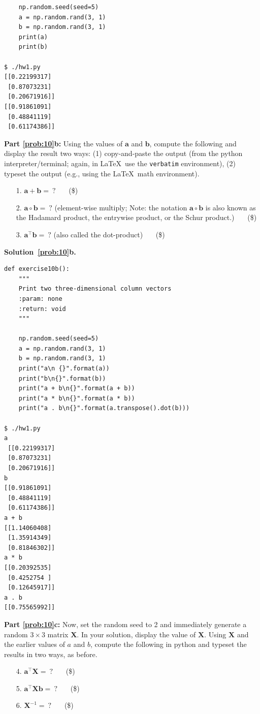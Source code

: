\documentclass[10pt]{article}
\begin{document}
\begin{enumerate}
\begin{verbatim}
    np.random.seed(seed=5)
    a = np.random.rand(3, 1)
    b = np.random.rand(3, 1)
    print(a)
    print(b)
    
$ ./hw1.py
[[0.22199317]
 [0.87073231]
 [0.20671916]]
[[0.91861091]
 [0.48841119]
 [0.61174386]]
\end{verbatim}

{\bf Part \ref{prob:10}b:} Using the values of $\mathbf{a}$ and $\mathbf{b}$, compute the following and display the result two ways: (1) copy-and-paste the output (from the python interpreter/terminal; again, in \LaTeX~use the {\tt verbatim} environment), (2) typeset the output (e.g., using the \LaTeX~math environment).
\begin{enumerate}
\item[1.] $\mathbf{a} + \mathbf{b} = ~?$ ~~~(\$)
\item[2.] $\mathbf{a} \circ \mathbf{b} = ~?$  (element-wise multiply; Note: the notation $\mathbf{a} \circ \mathbf{b}$ is also known as the Hadamard product, the entrywise product, or the Schur product.) ~~~(\$)
\item[3.] $\mathbf{a}^\top \mathbf{b} = ~?$  (also called the dot-product) ~~~(\$)
\end{enumerate}

{\bf Solution~\ref{prob:10}b.} 

\begin{verbatim}
def exercise10b():
    """
    Print two three-dimensional column vectors
    :param: none
    :return: void
    """

    np.random.seed(seed=5)
    a = np.random.rand(3, 1)
    b = np.random.rand(3, 1)
    print("a\n {}".format(a))
    print("b\n{}".format(b))
    print("a + b\n{}".format(a + b))
    print("a * b\n{}".format(a * b))
    print("a . b\n{}".format(a.transpose().dot(b)))

$ ./hw1.py
a
 [[0.22199317]
 [0.87073231]
 [0.20671916]]
b
[[0.91861091]
 [0.48841119]
 [0.61174386]]
a + b
[[1.14060408]
 [1.35914349]
 [0.81846302]]
a * b
[[0.20392535]
 [0.4252754 ]
 [0.12645917]]
a . b
[[0.75565992]]
\end{verbatim}



{\bf Part \ref{prob:10}c:} Now, set the random seed to 2 and immediately generate a random $3 \times 3$ matrix $\mathbf{X}$.  In your solution, display the value of $\mathbf{X}$.  Using $\mathbf{X}$ and the earlier values of $a$ and $b$, compute the following in python and typeset the results in two ways, as before.
\begin{enumerate}
\item[4.] $\mathbf{a}^\top\mathbf{X} = ~?$ ~~~(\$)
\item[5.] $\mathbf{a}^\top\mathbf{X}\mathbf{b} = ~?$ ~~~(\$)
\item[6.] $\mathbf{X}^{-1} = ~?$ ~~~(\$)
\end{enumerate}


\end{enumerate}
\end{document}
